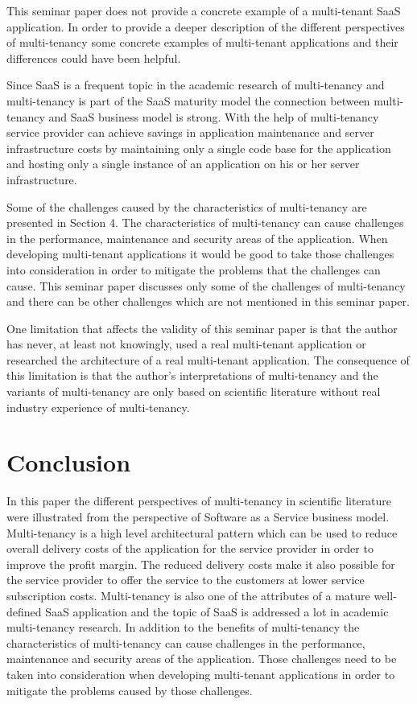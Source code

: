 \documentclass[conference]{sasmoota2017}
\begin{document}
This seminar paper does not provide a concrete example of a multi-tenant SaaS application. In order to provide a deeper description of the different perspectives of multi-tenancy some concrete examples of multi-tenant applications and their differences could have been helpful. 

Since SaaS is a frequent topic in the academic research of multi-tenancy and multi-tenancy is part of the SaaS maturity model the connection between multi-tenancy and SaaS business model is strong. With the help of multi-tenancy service provider can achieve savings in application maintenance and server infrastructure costs by maintaining only a single code base for the application and hosting only a single instance of an application on his or her server infrastructure. 

Some of the challenges caused by the characteristics of multi-tenancy are presented in Section 4. The characteristics of multi-tenancy can cause challenges in the performance, maintenance and security areas of the application. When developing multi-tenant applications it would be good to take those challenges into consideration in order to mitigate the problems that the challenges can cause. This seminar paper discusses only some of the challenges of multi-tenancy and there can be other challenges which are not mentioned in this seminar paper.

One limitation that affects the validity of this seminar paper is that the author has never, at least not knowingly, used a real multi-tenant application or researched the architecture of a real multi-tenant application. The consequence of this limitation is that the author's interpretations of multi-tenancy and the variants of multi-tenancy are only based on scientific literature without real industry experience of multi-tenancy. 

\section{Conclusion}

In this paper the different perspectives of multi-tenancy in scientific literature were illustrated from the perspective of Software as a Service business model. Multi-tenancy is a high level architectural pattern which can be used to reduce overall delivery costs of the application for the service provider in order to improve the profit margin. The reduced delivery costs make it also possible for the service provider to offer the service to the customers at lower service subscription costs. Multi-tenancy is also one of the attributes of a mature well-defined SaaS application and the topic of SaaS is addressed a lot in academic multi-tenancy research. In addition to the benefits of multi-tenancy the characteristics of multi-tenancy can cause challenges in the performance, maintenance and security areas of the application. Those challenges need to be taken into consideration when developing multi-tenant applications in order to mitigate the problems caused by those challenges. 
\end{document}
